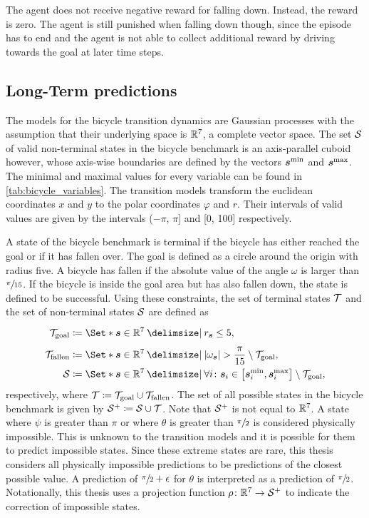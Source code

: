The agent does not receive negative reward for falling down.
Instead, the reward is zero.
The agent is still punished when falling down though, since the episode has to end and the agent is not able to collect additional reward by driving towards the goal at later time steps.

\subsection{Long-Term predictions}
\label{sub:map_predictions}
The models for the bicycle transition dynamics are Gaussian processes with the assumption that their underlying space is $\mathbb{R}^7$, a complete vector space.
The set $\mathcal{S}$ of valid non-terminal states in the bicycle benchmark is an axis-parallel cuboid however, whose axis-wise boundaries are defined by the vectors $\bm{s}^{\text{min}}$ and $\bm{s}^{\text{max}}$.
The minimal and maximal values for every variable can be found in \cref{tab:bicycle_variables}.
The transition models transform the euclidean coordinates $x$ and $y$ to the polar coordinates $\varphi$ and $r$.
Their intervals of valid values are given by the intervals ($-\pi$, $\pi$] and [0, 100] respectively.

A state of the bicycle benchmark is terminal if the bicycle has either reached the goal or if it has fallen over.
The goal is defined as a circle around the origin with radius five.
A bicycle has fallen if the absolute value of the angle $\omega$ is larger than $\sfrac{\pi}{15}$.
If the bicycle is inside the goal area but has also fallen down, the state is defined to be successful.
Using these constraints, the set of terminal states $\mathcal{T}$ and the set of non-terminal states $\mathcal{S}$ are defined as
\begin{align}
    \Goal &\coloneqq \Set*{\mat{s} \in \R^7 \with r_{\mat{s}} \leq 5 \vphantom{\frac{\pi}{15}}}, \\
    \Fallen &\coloneqq \Set*{\mat{s} \in \R^7 \with \abs{\omega_{\mat{s}}} > \frac{\pi}{15}} \setminus \Goal, \\
    \Es &\coloneqq \Set*{\mat{s} \in \R^7 \with \forall i \colon \mat{s}_i \in \left[ \mat{s}_i^{\text{min}}, \mat{s}_i^{\text{max}} \right]} \setminus \Goal,
\end{align}
respectively, where $\mathcal{T} \coloneqq \mathcal{T}_{\text{goal}} \cup \mathcal{T}_{\text{fallen}}$.
The set of all possible states in the bicycle benchmark is given by $\mathcal{S}^+ \coloneqq \mathcal{S} \cup \mathcal{T}$.
Note that $\mathcal{S}^+$ is not equal to $\mathbb{R}^7$.
A state where $\psi$ is greater than $\pi$ or where $\theta$ is greater than $\sfrac{\pi}{2}$ is considered physically impossible.
This is unknown to the transition models and it is possible for them to predict impossible states.
Since these extreme states are rare, this thesis considers all physically impossible predictions to be predictions of the closest possible value.
A prediction of $\sfrac{\pi}{2} + \epsilon$ for $\theta$ is interpreted as a prediction of $\sfrac{\pi}{2}$.
Notationally, this thesis uses a projection function $\squeeze \colon \R^7 \to \Es^+$ to indicate the correction of impossible states.

